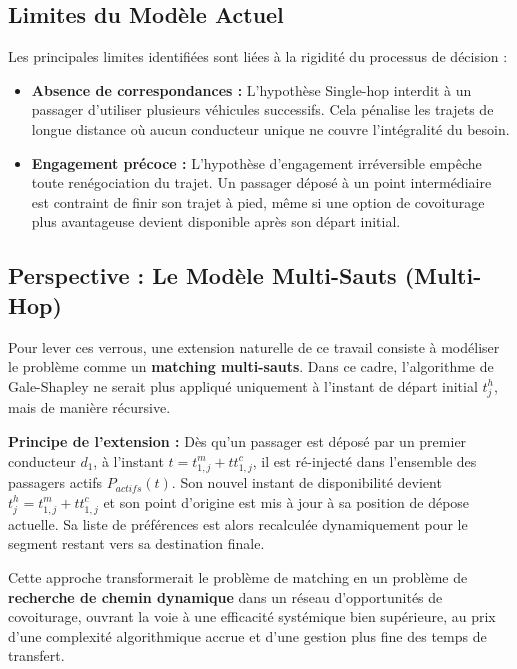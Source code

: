 \documentclass[12pt, a4paper]{article}
\begin{document}
\subsection{Limites du Modèle Actuel}
Les principales limites identifiées sont liées à la rigidité du processus de décision :
\begin{itemize}
    \item \textbf{Absence de correspondances :} L'hypothèse Single-hop interdit à un passager d'utiliser plusieurs véhicules successifs. Cela pénalise les trajets de longue distance où aucun conducteur unique ne couvre l'intégralité du besoin.
    \item \textbf{Engagement précoce :} L'hypothèse d'engagement irréversible empêche toute renégociation du trajet. Un passager déposé à un point intermédiaire est contraint de finir son trajet à pied, même si une option de covoiturage plus avantageuse devient disponible après son départ initial.
\end{itemize}

\subsection{Perspective : Le Modèle Multi-Sauts (Multi-Hop)}
Pour lever ces verrous, une extension naturelle de ce travail consiste à modéliser le problème comme un \textbf{matching multi-sauts}. Dans ce cadre, l'algorithme de Gale-Shapley ne serait plus appliqué uniquement à l'instant de départ initial $t^h_j$, mais de manière récursive.

\textbf{Principe de l'extension :}
Dès qu'un passager est déposé par un premier conducteur $d_1$, à l'instant $t = t^m_{1,j} + tt^c_{1,j}$, il est ré-injecté dans l'ensemble des passagers actifs $P_{actifs}(t)$. Son nouvel instant de disponibilité devient $t^h_j = t^m_{1,j} + tt^c_{1,j}$ et son point d'origine est mis à jour à sa position de dépose actuelle. Sa liste de préférences est alors recalculée dynamiquement pour le segment restant vers sa destination finale.

Cette approche transformerait le problème de matching en un problème de \textbf{recherche de chemin dynamique} dans un réseau d'opportunités de covoiturage, ouvrant la voie à une efficacité systémique bien supérieure, au prix d'une complexité algorithmique accrue et d'une gestion plus fine des temps de transfert.
\end{document}
